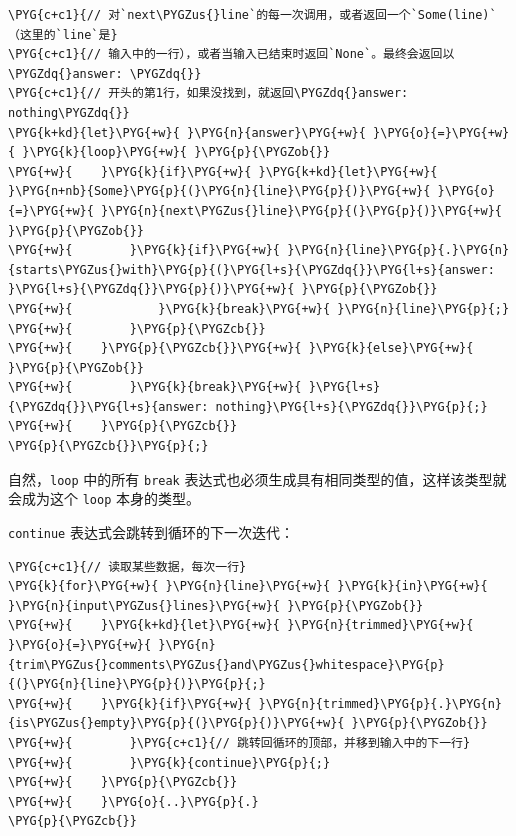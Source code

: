 \begin{Verbatim}[commandchars=\\\{\},breaklines=true,breakanywhere=true,fontsize=\codefont,xleftmargin=17bp]
\PYG{c+c1}{// 对`next\PYGZus{}line`的每一次调用，或者返回一个`Some(line)`（这里的`line`是}
\PYG{c+c1}{// 输入中的一行），或者当输入已结束时返回`None`。最终会返回以\PYGZdq{}answer: \PYGZdq{}}
\PYG{c+c1}{// 开头的第1行，如果没找到，就返回\PYGZdq{}answer: nothing\PYGZdq{}}
\PYG{k+kd}{let}\PYG{+w}{ }\PYG{n}{answer}\PYG{+w}{ }\PYG{o}{=}\PYG{+w}{ }\PYG{k}{loop}\PYG{+w}{ }\PYG{p}{\PYGZob{}}
\PYG{+w}{    }\PYG{k}{if}\PYG{+w}{ }\PYG{k+kd}{let}\PYG{+w}{ }\PYG{n+nb}{Some}\PYG{p}{(}\PYG{n}{line}\PYG{p}{)}\PYG{+w}{ }\PYG{o}{=}\PYG{+w}{ }\PYG{n}{next\PYGZus{}line}\PYG{p}{(}\PYG{p}{)}\PYG{+w}{ }\PYG{p}{\PYGZob{}}
\PYG{+w}{        }\PYG{k}{if}\PYG{+w}{ }\PYG{n}{line}\PYG{p}{.}\PYG{n}{starts\PYGZus{}with}\PYG{p}{(}\PYG{l+s}{\PYGZdq{}}\PYG{l+s}{answer: }\PYG{l+s}{\PYGZdq{}}\PYG{p}{)}\PYG{+w}{ }\PYG{p}{\PYGZob{}}
\PYG{+w}{            }\PYG{k}{break}\PYG{+w}{ }\PYG{n}{line}\PYG{p}{;}
\PYG{+w}{        }\PYG{p}{\PYGZcb{}}
\PYG{+w}{    }\PYG{p}{\PYGZcb{}}\PYG{+w}{ }\PYG{k}{else}\PYG{+w}{ }\PYG{p}{\PYGZob{}}
\PYG{+w}{        }\PYG{k}{break}\PYG{+w}{ }\PYG{l+s}{\PYGZdq{}}\PYG{l+s}{answer: nothing}\PYG{l+s}{\PYGZdq{}}\PYG{p}{;}
\PYG{+w}{    }\PYG{p}{\PYGZcb{}}
\PYG{p}{\PYGZcb{}}\PYG{p}{;}
\end{Verbatim}

自然，\texttt{loop} 中的所有 \texttt{break} 表达式也必须生成具有相同类型的值，这样该类型就会成为这个 \texttt{loop} 本身的类型。

\texttt{continue} 表达式会跳转到循环的下一次迭代：

\begin{Verbatim}[commandchars=\\\{\},breaklines=true,breakanywhere=true,fontsize=\codefont,xleftmargin=17bp]
\PYG{c+c1}{// 读取某些数据，每次一行}
\PYG{k}{for}\PYG{+w}{ }\PYG{n}{line}\PYG{+w}{ }\PYG{k}{in}\PYG{+w}{ }\PYG{n}{input\PYGZus{}lines}\PYG{+w}{ }\PYG{p}{\PYGZob{}}
\PYG{+w}{    }\PYG{k+kd}{let}\PYG{+w}{ }\PYG{n}{trimmed}\PYG{+w}{ }\PYG{o}{=}\PYG{+w}{ }\PYG{n}{trim\PYGZus{}comments\PYGZus{}and\PYGZus{}whitespace}\PYG{p}{(}\PYG{n}{line}\PYG{p}{)}\PYG{p}{;}
\PYG{+w}{    }\PYG{k}{if}\PYG{+w}{ }\PYG{n}{trimmed}\PYG{p}{.}\PYG{n}{is\PYGZus{}empty}\PYG{p}{(}\PYG{p}{)}\PYG{+w}{ }\PYG{p}{\PYGZob{}}
\PYG{+w}{        }\PYG{c+c1}{// 跳转回循环的顶部，并移到输入中的下一行}
\PYG{+w}{        }\PYG{k}{continue}\PYG{p}{;}
\PYG{+w}{    }\PYG{p}{\PYGZcb{}}
\PYG{+w}{    }\PYG{o}{..}\PYG{p}{.}
\PYG{p}{\PYGZcb{}}
\end{Verbatim}

